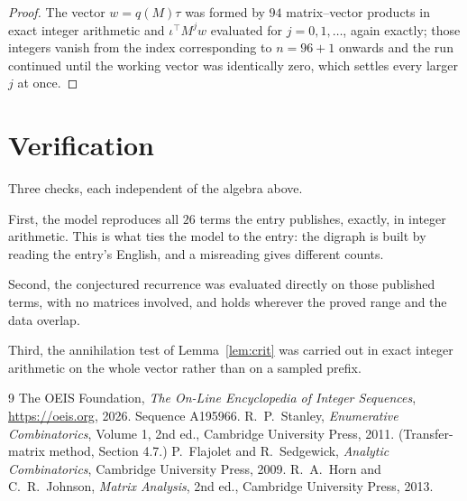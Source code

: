 \documentclass[11pt,a4paper]{article}
\theoremstyle{plain}
\theoremstyle{definition}
\begin{document}
\begin{proof}
The vector $w=q(M)\tau$ was formed by $94$ matrix--vector products in exact integer
arithmetic and $\iota^{\!\top}M^{j}w$ evaluated for $j=0,1,\dots$, again exactly; those
integers vanish from the index corresponding to $n=96+1$ onwards and the run continued
until the working vector was identically zero, which settles every larger $j$ at once.
\end{proof}

\section{Verification}

Three checks, each independent of the algebra above.

First, the model reproduces all $26$ terms the entry publishes, exactly, in integer
arithmetic. This is what ties the model to the entry: the digraph is built by reading the
entry's English, and a misreading gives different counts.

Second, the conjectured recurrence was evaluated directly on those published terms, with no
matrices involved, and holds wherever the proved range and the data overlap.

Third, the annihilation test of Lemma~\ref{lem:crit} was carried out in exact integer
arithmetic on the whole vector rather than on a sampled prefix.

\begin{thebibliography}{9}
 The OEIS Foundation, \emph{The On-Line Encyclopedia of Integer
Sequences}, \url{https://oeis.org}, 2026. Sequence A195966.
 R.~P.~Stanley, \emph{Enumerative Combinatorics}, Volume 1, 2nd ed.,
Cambridge University Press, 2011. (Transfer-matrix method, Section 4.7.)
 P.~Flajolet and R.~Sedgewick, \emph{Analytic Combinatorics}, Cambridge
University Press, 2009.
 R.~A.~Horn and C.~R.~Johnson, \emph{Matrix Analysis}, 2nd ed., Cambridge
University Press, 2013.
\end{thebibliography}
\end{document}
